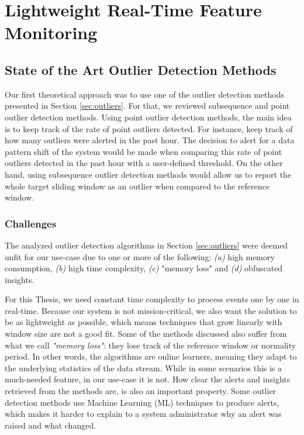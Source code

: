 \chapter{Lightweight Real-Time Feature Monitoring} \label{chap:my-work} \minitoc

\section{State of the Art Outlier Detection Methods}
Our first theoretical approach was to use one of the outlier detection methods presented in Section \ref{sec:outliers}. For that, we reviewed subsequence and point outlier detection methods. Using point outlier detection methods, the main idea is to keep track of the rate of point outliers detected. For instance, keep track of how many outliers were alerted in the past hour. The decision to alert for a data pattern shift of the system would be made when comparing this rate of point outliers detected in the past hour with a user-defined threshold. On the other hand, using subsequence outlier detection methods would allow us to report the whole target sliding window as an outlier when compared to the reference window. 


\subsection*{Challenges}
The analyzed outlier detection algorithms in Section \ref{sec:outliers} were deemed unfit for our use-case due to one or more of the following: \textit{(a)} high memory consumption, \textit{(b)} high time complexity, \textit{(c)} "memory loss" and \textit{(d)} obfuscated insights.

For this Thesis, we need constant time complexity to process events one by one in real-time. Because our system is not mission-critical, we also want the solution to be as lightweight as possible, which means techniques that grow linearly with window size are not a good fit. Some of the methods discussed also suffer from what we call \textit{"memory loss"}: they lose track of the reference window or normality period. In other words, the algorithms are online learners, meaning they adapt to the underlying statistics of the data stream. While in some scenarios this is a much-needed feature, in our use-case it is not. How clear the alerts and insights retrieved from the methods are, is also an important property. Some outlier detection methods use Machine Learning (ML) techniques to produce alerts, which makes it harder to explain to a system administrator why an alert was raised and what changed.

